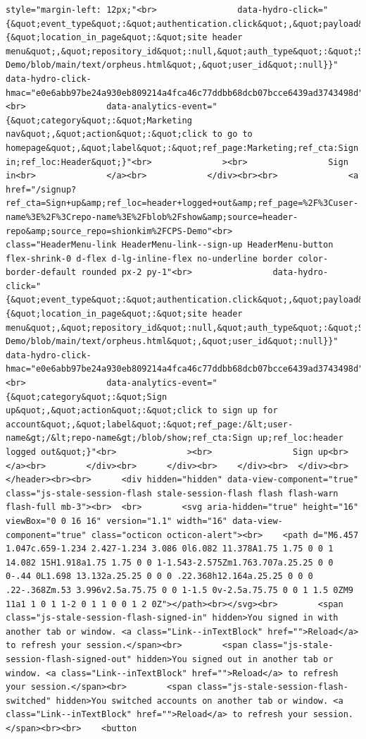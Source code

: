 \documentclass[
  letterpaper,
]{book}
\begin{document}
\begin{verbatim}
style="margin-left: 12px;"<br>                data-hydro-click="{&quot;event_type&quot;:&quot;authentication.click&quot;,&quot;payload&quot;:{&quot;location_in_page&quot;:&quot;site header menu&quot;,&quot;repository_id&quot;:null,&quot;auth_type&quot;:&quot;SIGN_UP&quot;,&quot;originating_url&quot;:&quot;https://github.com/shionkim/CPS-Demo/blob/main/text/orpheus.html&quot;,&quot;user_id&quot;:null}}" data-hydro-click-hmac="e0e6abb97be24a930eb809214a4fca46c77ddbb68dcb07bcce6439ad3743498d"<br>                data-analytics-event="{&quot;category&quot;:&quot;Marketing nav&quot;,&quot;action&quot;:&quot;click to go to homepage&quot;,&quot;label&quot;:&quot;ref_page:Marketing;ref_cta:Sign in;ref_loc:Header&quot;}"<br>              ><br>                Sign in<br>              </a><br>            </div><br><br>              <a href="/signup?ref_cta=Sign+up&amp;ref_loc=header+logged+out&amp;ref_page=%2F%3Cuser-name%3E%2F%3Crepo-name%3E%2Fblob%2Fshow&amp;source=header-repo&amp;source_repo=shionkim%2FCPS-Demo"<br>                class="HeaderMenu-link HeaderMenu-link--sign-up HeaderMenu-button flex-shrink-0 d-flex d-lg-inline-flex no-underline border color-border-default rounded px-2 py-1"<br>                data-hydro-click="{&quot;event_type&quot;:&quot;authentication.click&quot;,&quot;payload&quot;:{&quot;location_in_page&quot;:&quot;site header menu&quot;,&quot;repository_id&quot;:null,&quot;auth_type&quot;:&quot;SIGN_UP&quot;,&quot;originating_url&quot;:&quot;https://github.com/shionkim/CPS-Demo/blob/main/text/orpheus.html&quot;,&quot;user_id&quot;:null}}" data-hydro-click-hmac="e0e6abb97be24a930eb809214a4fca46c77ddbb68dcb07bcce6439ad3743498d"<br>                data-analytics-event="{&quot;category&quot;:&quot;Sign up&quot;,&quot;action&quot;:&quot;click to sign up for account&quot;,&quot;label&quot;:&quot;ref_page:/&lt;user-name&gt;/&lt;repo-name&gt;/blob/show;ref_cta:Sign up;ref_loc:header logged out&quot;}"<br>              ><br>                Sign up<br>              </a><br>        </div><br>      </div><br>    </div><br>  </div><br></header><br><br>      <div hidden="hidden" data-view-component="true" class="js-stale-session-flash stale-session-flash flash flash-warn flash-full mb-3"><br>  <br>        <svg aria-hidden="true" height="16" viewBox="0 0 16 16" version="1.1" width="16" data-view-component="true" class="octicon octicon-alert"><br>    <path d="M6.457 1.047c.659-1.234 2.427-1.234 3.086 0l6.082 11.378A1.75 1.75 0 0 1 14.082 15H1.918a1.75 1.75 0 0 1-1.543-2.575Zm1.763.707a.25.25 0 0 0-.44 0L1.698 13.132a.25.25 0 0 0 .22.368h12.164a.25.25 0 0 0 .22-.368Zm.53 3.996v2.5a.75.75 0 0 1-1.5 0v-2.5a.75.75 0 0 1 1.5 0ZM9 11a1 1 0 1 1-2 0 1 1 0 0 1 2 0Z"></path><br></svg><br>        <span class="js-stale-session-flash-signed-in" hidden>You signed in with another tab or window. <a class="Link--inTextBlock" href="">Reload</a> to refresh your session.</span><br>        <span class="js-stale-session-flash-signed-out" hidden>You signed out in another tab or window. <a class="Link--inTextBlock" href="">Reload</a> to refresh your session.</span><br>        <span class="js-stale-session-flash-switched" hidden>You switched accounts on another tab or window. <a class="Link--inTextBlock" href="">Reload</a> to refresh your session.</span><br><br>    <button 
\end{verbatim}
\end{document}

